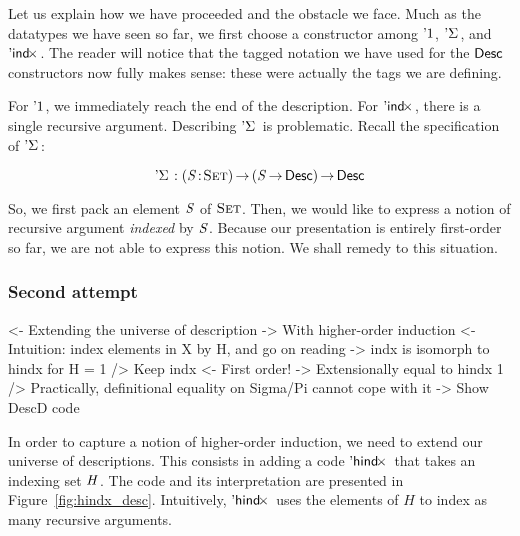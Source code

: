 Let us explain how we have proceeded and the obstacle we face. Much as
the datatypes we have seen so far, we first choose a constructor among
$\DUnit$, $\DSigma{\!}{\!}$, and $\DIndx{\!}$. The reader will notice
that the tagged notation we have used for the $\Desc$ constructors now
fully makes sense: these were actually the tags we are defining.

For $\DUnit$, we immediately reach the end of the description. For
$\DIndx{\!}$, there is a single recursive argument. Describing
$\DSigma{\!}{\!}$ is problematic. Recall the specification of
$\DSigma{\!}{\!}$:

\[    \DSigma{\!}{\!} : \PI{\V{S}}{\Set} \PIS{\V{S} \To \Desc} \Desc      \]

So, we first pack an element $\V{S}$ of $\Set$. Then, we would like to
express a notion of recursive argument \emph{indexed} by $\V{S}$. Because
our presentation is entirely first-order so far, we are not able to
express this notion. We shall remedy to this situation.


\subsubsection{Second attempt}

\begin{wstructure}
<- Extending the universe of description
    -> With higher-order induction
    <- Intuition: index elements in X by H, and go on reading
        -> indx is isomorph to hindx for H = 1
    /> Keep indx
        <- First order!
        -> Extensionally equal to hindx 1
        /> Practically, definitional equality on Sigma/Pi cannot cope with it
    -> Show DescD code
\end{wstructure}

In order to capture a notion of higher-order induction, we need to
extend our universe of descriptions. This consists in adding a code
$\DHindx{\!}{\!}$ that takes an indexing set $\V{H}$. The code and its
interpretation are presented in
Figure~\ref{fig:hindx_desc}. Intuitively, $\DHindx{\!}{\!}$ uses the
elements of $H$ to index as many recursive arguments.

